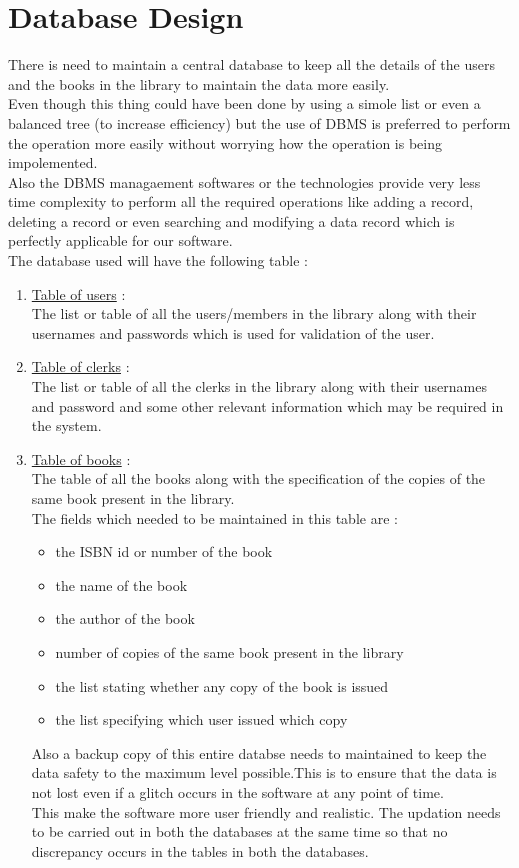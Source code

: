 \documentclass[a4paper]{article}
\begin{document}
\section{Database Design}
There is need to maintain a central database to keep all the details of the users and the books in the library to maintain the data more easily.\\
Even though this thing could have been done by using a simole list or even a balanced tree (to increase efficiency) but the use of DBMS is preferred to perform the operation more easily without worrying how the operation is being impolemented.\\
Also the DBMS managaement softwares or the technologies provide very less time complexity to perform all the required operations like adding a record, deleting a record or even searching and modifying a data record which is perfectly applicable for our software.\\
The database used will have the following table : 
\begin{enumerate}
\item \underline{Table of users} :\\
The list or table of all the users/members in the library along with their usernames and passwords which is used for validation of the user.
\item \underline{Table of clerks} : \\
The list or table of all the clerks in the library along with their usernames and password and some other relevant information which may be required in the system.
\item \underline{Table of books} : \\
The table of all the books along with the specification of the copies of the same book present in the library.
\\The fields which needed to be maintained in this table are :
\begin{itemize}
\item the ISBN id or number of the book
\item the name of the book
\item the author of the book
\item number of copies of the same book present in the library
\item the list stating whether any copy of the book is issued
\item the list specifying which user issued which copy
\end{itemize}


Also a backup copy of this entire databse needs to maintained to keep the data safety to the maximum level possible.This is to ensure that the data is not lost even if a glitch occurs in the software at any point of time.\\This make the software more user friendly and realistic.
The updation needs to be carried out in both the databases at the same time so that no discrepancy occurs in the tables in both the databases.
\\
\end{enumerate}
\end{document}

